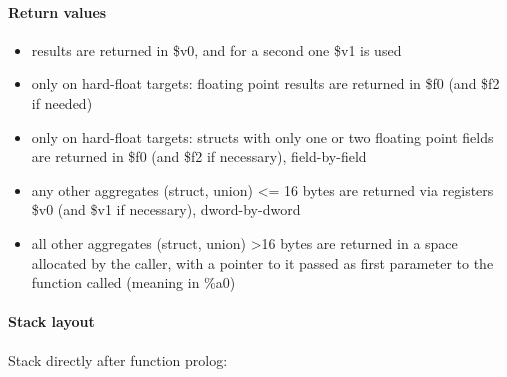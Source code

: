\paragraph{Return values}

\begin{itemize}
\item results are returned in \$v0, and for a second one \$v1 is used
\item only on hard-float targets: floating point results are returned in \$f0 (and \$f2 if needed)
\item only on hard-float targets: structs with only one or two floating point fields are returned in \$f0 (and \$f2 if necessary), field-by-field
\item any other aggregates (struct, union) \textless= 16 bytes are returned via registers \$v0 (and \$v1 if necessary), dword-by-dword
\item all other aggregates (struct, union) \textgreater 16 bytes are returned in a space allocated by the caller, with a pointer to it
passed as first parameter to the function called (meaning in \%a0)
\end{itemize}


\paragraph{Stack layout}

Stack directly after function prolog:\\

